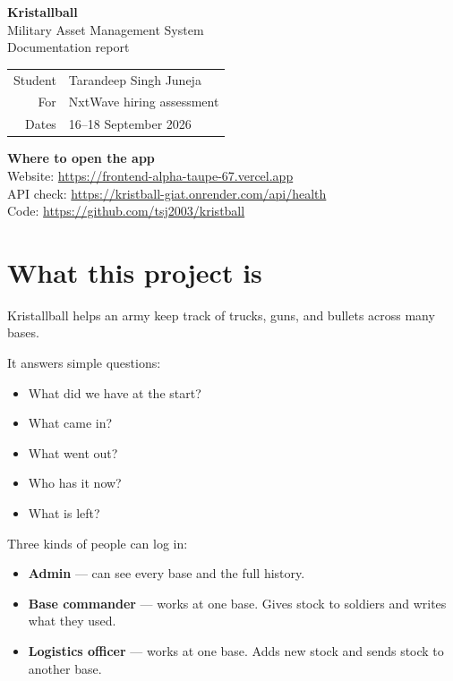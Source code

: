 \documentclass[11pt,a4paper]{article}
\newcommand{\livefront}{https://frontend-alpha-taupe-67.vercel.app}
\newcommand{\liveapi}{https://kristball-giat.onrender.com}
\newcommand{\livegit}{https://github.com/tsj2003/kristball}
\begin{document}
\begin{center}
{\LARGE\bfseries Kristallball}\\[4pt]
{\large Military Asset Management System}\\[8pt]
{\normalsize Documentation report}\\[12pt]
\begin{tabular}{rl}
Student & Tarandeep Singh Juneja \\
For & NxtWave hiring assessment \\
Dates & 16--18 September 2026 \\
\end{tabular}
\end{center}

\vspace{10pt}
\noindent\textbf{Where to open the app}\\[4pt]
Website: \url{\livefront}\\
API check: \url{\liveapi/api/health}\\
Code: \url{\livegit}

\tableofcontents
\newpage

\section{What this project is}

Kristallball helps an army keep track of trucks, guns, and bullets across many bases.

It answers simple questions:

\begin{itemize}
  \item What did we have at the start?
  \item What came in?
  \item What went out?
  \item Who has it now?
  \item What is left?
\end{itemize}

Three kinds of people can log in:

\begin{itemize}
  \item \textbf{Admin} --- can see every base and the full history.
  \item \textbf{Base commander} --- works at one base. Gives stock to soldiers and writes what they used.
  \item \textbf{Logistics officer} --- works at one base. Adds new stock and sends stock to another base.
\end{itemize}
\end{document}
